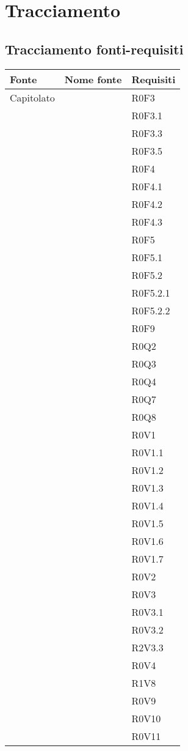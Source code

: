 \documentclass[AnalisiDeiRequisiti.tex]{subfiles}
\begin{document}
\section{Tracciamento}
\subsection{Tracciamento fonti-requisiti}

\label{table:Tabella di tracciamento fonti-requisiti}
\begin{longtable}[H]{|p{2cm}|p{5cm}|p{5cm}|}
	\hline
	\rowcolor[HTML]{38FFF8} 
	\textbf{Fonte} & \textbf{Nome fonte} & \textbf{Requisiti} \\ \hline
	\endhead
	Capitolato & & R0F3 \\
	& & R0F3.1 \\
	& & R0F3.3 \\
	& & R0F3.5 \\
	& & R0F4 \\
	& & R0F4.1 \\
	& & R0F4.2 \\
	& & R0F4.3 \\
	& & R0F5 \\
	& & R0F5.1 \\
	& & R0F5.2 \\
	& & R0F5.2.1 \\
	& & R0F5.2.2 \\
	& & R0F9 \\
	& & R0Q2 \\
	& & R0Q3 \\
	& & R0Q4 \\
	& & R0Q7 \\
	& & R0Q8 \\
	& & R0V1 \\
	& & R0V1.1 \\
	& & R0V1.2 \\
	& & R0V1.3 \\
	& & R0V1.4 \\
	& & R0V1.5 \\
	& & R0V1.6 \\
	& & R0V1.7 \\
	& & R0V2 \\
	& & R0V3 \\
	& & R0V3.1 \\
	& & R0V3.2 \\
	& & R2V3.3 \\
	& & R0V4 \\
	& & R1V8 \\
	& & R0V9 \\
	& & R0V10 \\
	& & R0V11 \\ \hline
	

\end{longtable}
\end{document}
